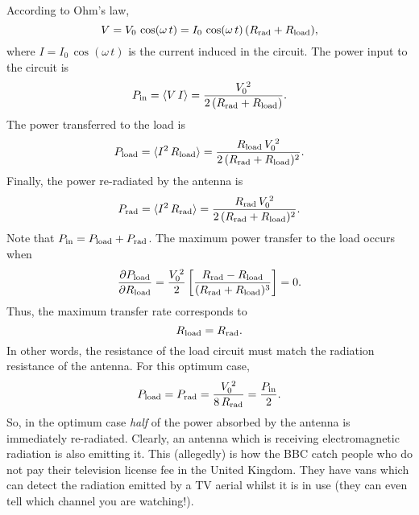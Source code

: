According to Ohm's law,
\begin{equation}
V=V_0 \,\cos(\omega\, t) = I_0\, \cos(\omega\, t)\, (R_{\rm rad} + R_{\rm load}),
\end{equation}
where $I= I_0\,\cos(\omega\, t)$ is the current induced in the circuit. 
The power input to the circuit is
\begin{equation}
P_{\rm in} = \langle V\,I\rangle = \frac{V_0^{\,2}}{2\,(R_{\rm rad} + R_{\rm load})}.
\end{equation}
The power transferred to the load is
\begin{equation}
P_{\rm load} = \langle I^2 \,R_{\rm load}\rangle = \frac{R_{\rm load} \,V_0^{\,2}}
{2\,(R_{\rm rad} + R_{\rm load})^2}.
\end{equation}
Finally, the power re-radiated by the antenna is 
\begin{equation}
P_{\rm rad} = \langle I^2 \,R_{\rm rad}\rangle = \frac{R_{\rm rad} \,V_0^{\,2}}
{2\,(R_{\rm rad} + R_{\rm load})^2}.
\end{equation}
Note that $P_{\rm in} = P_{\rm load} + P_{\rm rad}$.
The maximum power transfer to the load occurs when
\begin{equation}
\frac{\partial P_{\rm load}}{\partial R_{\rm load}} = \frac{V_0^{\,2}}{2}\left[
\frac{R_{\rm rad} - R_{\rm load}}{(R_{\rm rad} + R_{\rm load})^3}\right] = 0.
\end{equation}
Thus, the maximum transfer rate corresponds to
\begin{equation}
R_{\rm load} = R_{\rm rad}.
\end{equation}
In other words, the resistance of the load circuit must match the radiation
resistance of the antenna. 
For this optimum case,
\begin{equation}
P_{\rm load} = P_{\rm rad} = \frac{V_0^{\,2}}{8 \,R_{\rm rad}} = \frac{P_{\rm in}}{2}.
\end{equation}
So, in the optimum case {\em  half}
 of the power absorbed by the antenna is immediately
re-radiated. Clearly,  an antenna which
is receiving electromagnetic radiation is also  emitting it. 
This (allegedly) is how the BBC catch people who do not pay their television license fee in
the United Kingdom. They have vans which can detect the radiation emitted by
a TV aerial whilst it is in use (they can even tell which channel you are watching!).

